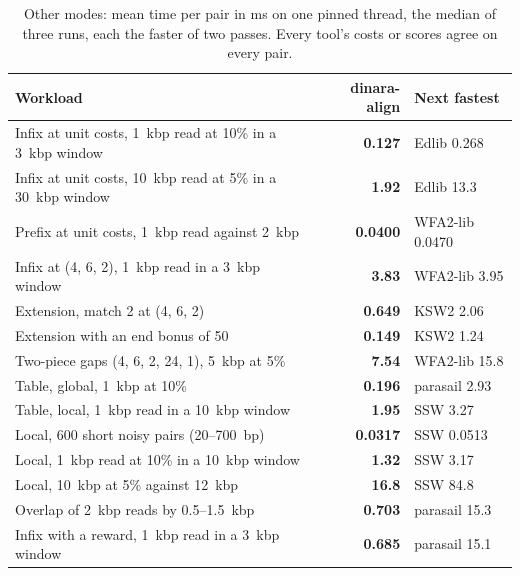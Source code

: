 \documentclass[10pt]{article}
\begin{document}
\begin{table}[t]
\caption{Other modes: mean time per pair in ms on one pinned thread, the median of three runs, each the faster of two passes. Every tool's costs or scores agree on every pair.}\label{tab:modes}
\centering\footnotesize
\setlength{\tabcolsep}{4pt}
\begin{tabular}{@{}>{\raggedright\arraybackslash}p{3.1cm}rl@{}}
\toprule
Workload & dinara-align & Next fastest \\
\midrule
Infix at unit costs, 1~kbp read at 10\% in a 3~kbp window & \textbf{0.127} & Edlib 0.268 \\
Infix at unit costs, 10~kbp read at 5\% in a 30~kbp window & \textbf{1.92} & Edlib 13.3 \\
Prefix at unit costs, 1~kbp read against 2~kbp & \textbf{0.0400} & WFA2-lib 0.0470 \\
Infix at (4, 6, 2), 1~kbp read in a 3~kbp window & \textbf{3.83} & WFA2-lib 3.95 \\
Extension, match 2 at (4, 6, 2) & \textbf{0.649} & KSW2 2.06 \\
Extension with an end bonus of 50 & \textbf{0.149} & KSW2 1.24 \\
Two-piece gaps (4, 6, 2, 24, 1), 5~kbp at 5\% & \textbf{7.54} & WFA2-lib 15.8 \\
Table, global, 1~kbp at 10\% & \textbf{0.196} & parasail 2.93 \\
Table, local, 1~kbp read in a 10~kbp window & \textbf{1.95} & SSW 3.27 \\
Local, 600 short noisy pairs (20–700~bp) & \textbf{0.0317} & SSW 0.0513 \\
Local, 1~kbp read at 10\% in a 10~kbp window & \textbf{1.32} & SSW 3.17 \\
Local, 10~kbp at 5\% against 12~kbp & \textbf{16.8} & SSW 84.8 \\
Overlap of 2~kbp reads by 0.5–1.5~kbp & \textbf{0.703} & parasail 15.3 \\
Infix with a reward, 1~kbp read in a 3~kbp window & \textbf{0.685} & parasail 15.1 \\
\bottomrule
\end{tabular}
\end{table}
\end{document}
